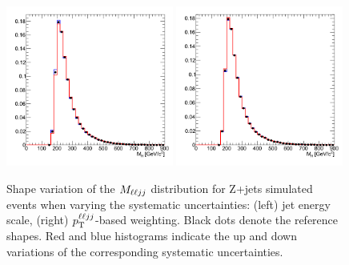 \begin{figure}[htb]
\begin{center}
\centerline{
\includegraphics[width=0.49\textwidth]{plots/dy_jse.png}
\includegraphics[width=0.49\textwidth]{plots/dy_pthe.png}
}
\caption{Shape variation of the $M_{\ell\ell jj}$ distribution for Z+jets simulated
events when varying the systematic uncertainties: (left) jet energy scale,
(right) $p_{\mathrm{T}}^{\ell\ell jj}$-based weighting. Black dots denote
the reference shapes. Red and blue histograms indicate the up and down variations
of the corresponding systematic uncertainties.
}
\label{fig:sysshape}
\end{center}
\end{figure}

